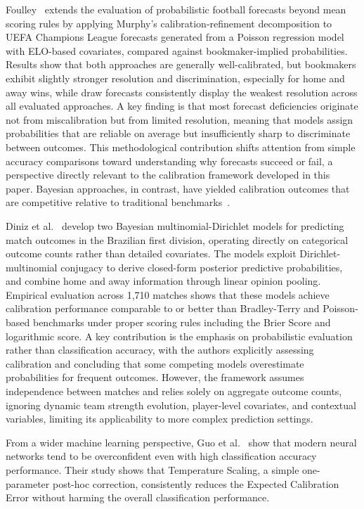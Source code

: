 \documentclass[conference]{IEEEtran}
\begin{document}
Foulley~\cite{b11} extends the evaluation of probabilistic
football forecasts beyond mean scoring rules by applying Murphy's
calibration-refinement decomposition to UEFA Champions League
forecasts generated from a Poisson regression model with
ELO-based covariates, compared against bookmaker-implied
probabilities. Results show that both approaches are generally
well-calibrated, but bookmakers exhibit slightly stronger
resolution and discrimination, especially for home and away wins,
while draw forecasts consistently display the weakest resolution
across all evaluated approaches. A key finding is that most
forecast deficiencies originate not from miscalibration but from
limited resolution, meaning that models assign probabilities that
are reliable on average but insufficiently sharp to discriminate
between outcomes. This methodological contribution shifts
attention from simple accuracy comparisons toward understanding
why forecasts succeed or fail, a perspective directly relevant to
the calibration framework developed in this paper.
Bayesian approaches, in contrast, have yielded calibration
outcomes that are competitive relative to traditional
benchmarks~\cite{b8}.

Diniz et al.~\cite{b8} develop two Bayesian multinomial-Dirichlet
models for predicting match outcomes in the Brazilian first
division, operating directly on categorical outcome counts rather
than detailed covariates. The models exploit Dirichlet-multinomial
conjugacy to derive closed-form posterior predictive
probabilities, and combine home and away information through
linear opinion pooling. Empirical evaluation across 1,710 matches
shows that these models achieve calibration performance comparable
to or better than Bradley-Terry and Poisson-based benchmarks
under proper scoring rules including the Brier Score and
logarithmic score. A key contribution is the emphasis on
probabilistic evaluation rather than classification accuracy,
with the authors explicitly assessing calibration and concluding
that some competing models overestimate probabilities for frequent
outcomes. However, the framework assumes independence between
matches and relies solely on aggregate outcome counts, ignoring
dynamic team strength evolution, player-level covariates, and
contextual variables, limiting its applicability to more complex
prediction settings.

From a wider machine learning perspective, Guo et al.~\cite{b9}
show that modern neural networks tend to be overconfident even
with high classification accuracy performance. Their study shows
that Temperature Scaling, a simple one-parameter post-hoc
correction, consistently reduces the Expected Calibration Error
without harming the overall classification performance.
\end{document}
